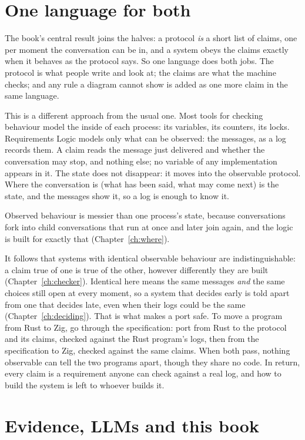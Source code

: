 \documentclass[11pt,oneside]{book}
\theoremstyle{remark}
\begin{document}
\section*{One language for both}

The book's central result joins the halves: a protocol \emph{is} a short list of claims,
one per moment the conversation can be in, and a system obeys the claims exactly when it
behaves as the protocol says. So one language does both jobs. The protocol is what people
write and look at; the claims are what the machine checks; and any rule a diagram cannot
show is added as one more claim in the same language.

This is a different approach from the usual one. Most tools for checking behaviour model
the inside of each process: its variables, its counters, its locks. Requirements Logic
models only what can be observed: the messages, as a log records them. A claim reads the
message just delivered and whether the conversation may stop, and nothing else; no variable
of any implementation appears in it. The state does not disappear: it moves into the
observable protocol. Where the conversation is (what has been said, what may come next) is
the state, and the messages show it, so a log is enough to know it.

Observed behaviour is messier than one process's
state, because conversations fork into child conversations that run at once and later join
again, and the logic is built for exactly that (Chapter~\ref{ch:where}).

It follows that systems with identical observable behaviour are indistinguishable: a claim
true of one is true of the other, however differently they are built (Chapter~\ref{ch:checker}).
Identical here means the same messages \emph{and} the same choices still open at every
moment, so a system that decides early is told apart from one that decides late, even when
their logs could be the same (Chapter~\ref{ch:deciding}). That is what makes a port
safe. To move a program from Rust to Zig, go through the specification: port from Rust to
the protocol and its claims, checked against the Rust program's logs, then from the
specification to Zig, checked against the same claims. When both pass, nothing observable
can tell the two programs apart, though they share no code. In return, every
claim is a requirement anyone can check against a real log, and how to build the system is
left to whoever builds it.

\section*{Evidence, LLMs and this book}
\end{document}
